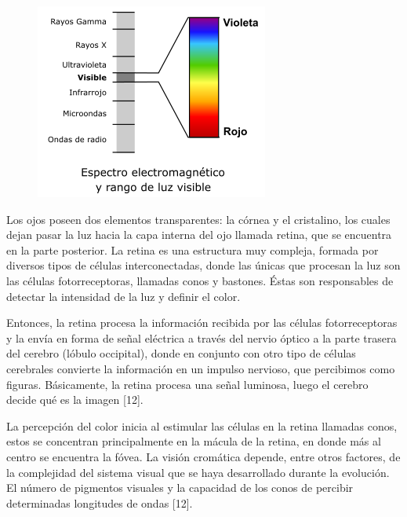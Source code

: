 \documentclass[10pt]{article}
\begin{document}
\begin{figure}[H]
	\begin{center}
\includegraphics[scale = 0.85]{Imagenes/espectro.png}
	\end{center} 
\end{figure}

Los ojos poseen dos elementos transparentes: la córnea y el cristalino, los cuales dejan pasar la luz hacia la capa interna del ojo llamada retina, que se encuentra en la parte posterior. La retina es una estructura muy compleja, formada por diversos tipos de células interconectadas, donde las únicas que procesan la luz son las células fotorreceptoras, llamadas conos y bastones. Éstas son responsables de detectar la intensidad de la luz y definir el color.

\setlength{\parskip}{2mm}

Entonces, la retina procesa la información recibida por las células fotorreceptoras y la envía en forma de señal eléctrica a través del nervio óptico a la parte trasera del cerebro (lóbulo occipital), donde en conjunto con otro tipo de células cerebrales convierte la información en un impulso nervioso, que percibimos como figuras. Básicamente, la retina procesa una señal luminosa, luego el cerebro decide qué es la imagen [12].

\setlength{\parskip}{2mm}

La percepción del color inicia al estimular las células en la retina llamadas conos, estos  se concentran principalmente en la mácula de la retina, en donde más al centro se encuentra la fóvea. La visión cromática depende, entre otros factores, de la complejidad del sistema visual que se haya desarrollado durante la evolución. El número de pigmentos visuales y la capacidad de los conos de percibir determinadas longitudes de ondas [12].
\end{document}
